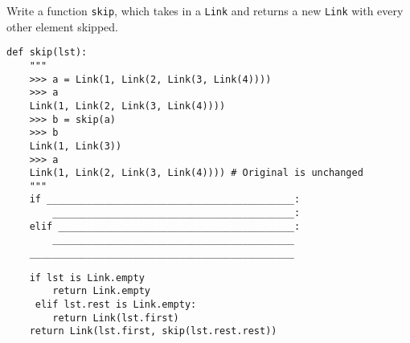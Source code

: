 \begin{blocksection}
\question Write a function \texttt{skip}, which takes in a \texttt{Link} and returns a new \texttt{Link} with every other element skipped.

\begin{lstlisting}
def skip(lst):
    """
    >>> a = Link(1, Link(2, Link(3, Link(4))))
    >>> a
    Link(1, Link(2, Link(3, Link(4))))
    >>> b = skip(a)
    >>> b
    Link(1, Link(3))
    >>> a
    Link(1, Link(2, Link(3, Link(4)))) # Original is unchanged
    """
    if ___________________________________________:
        __________________________________________:
    elif _________________________________________:
        __________________________________________
    ______________________________________________
\end{lstlisting}
\begin{solution}[0.6in]
\begin{lstlisting}
    if lst is Link.empty 
    	return Link.empty
     elif lst.rest is Link.empty:
        return Link(lst.first)
    return Link(lst.first, skip(lst.rest.rest))
\end{lstlisting}
\end{solution}
\end{blocksection}
